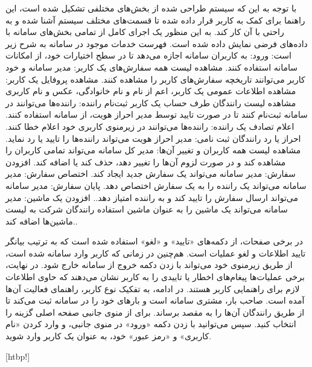 
با توجه به این که سیستم طراحی شده از بخش‌های مختلفی تشکیل شده است، این راهنما برای کمک به کاربر قرار داده شده تا قسمت‌های مختلف سیستم آشنا شده و به راحتی با آن کار کند. به این منظور یک اجرای کامل از تمامی بخش‌های سامانه با داده‌های فرضی نمایش داده شده است. فهرست خدمات موجود در سامانه به شرح زیر است:
     ورود: به کاربران سامانه اجازه می‌دهد تا در سطح اختیارات خود، از امکانات سامانه استفاده کنند.
     مشاهده لیست همه سفارش‌های یک کاربر: مدیر سامانه و خود کاربر می‌توانند تاریخچه سفارش‌های کاربر را مشاهده کنند.
     مشاهده پروفایل یک کاربر: مشاهده اطلاعات عمومی یک کاربر، اعم از نام و نام خانوادگی، عکس و نام کاربری
     مشاهده لیست رانندگان طرف حساب یک کاربر
     ثبت‌نام راننده: راننده‌ها می‌توانند در سامانه ثبت‌نام کنند تا در صورت تایید توسط مدیر احراز هویت، از سامانه استفاده کنند.
     اعلام تصادف یک راننده: راننده‌ها می‌توانند در زیرمنوی کاربری خود اعلام خطا کنند.
     احراز یا رد رانندگان ثبت نامی: مدیر احراز هویت می‌تواند راننده‌ها را تایید یا رد نماید.
     مشاهده لیست همه کاربران و تغییر آن‌ها: مدیر کل سامانه می‌تواند تمامی کاربران را مشاهده کند و در صورت لزوم آن‌ها را تغییر دهد، حذف کند یا اضافه کند.
     افزودن سفارش: مدیر سامانه می‌تواند یک سفارش جدید ایجاد کند.
     اختصاص سفارش: مدیر سامانه می‌تواند یک راننده را به یک سفارش اختصاص دهد.
     پایان سفارش: مدیر سامانه می‌تواند ارسال سفارش را تایید کند و به راننده امتیاز دهد..
     افزودن یک ماشین: مدیر سامانه می‌تواند یک ماشین را به عنوان ماشین استفاده رانندگان شرکت به لیست ماشین‌ها اضافه کند..
    
در برخی صفحات، از دکمه‌های «تایید» و «لغو» استفاده شده است که به ترتیب بیانگر تایید اطلاعات و لغو عملیات است. هم‌چنین در زمانی که کاربر وارد سامانه شده است، از طریق زیرمنوی خود می‌تواند با زدن دکمه خروج از سامانه خارج شود. در نهایت، برخی عملیات‌ها پیغام‌های اخطار یا تاییدی را به کاربر نشان می‌دهند که حاوی اطلاعات لازم برای راهنمایی کاربر هستند. در ادامه، به تفکیک نوع کاربر، راهنمای فعالیت آن‌ها آمده است.
\newpage
{}
     
             صاحب بار، مشتری سامانه است و بارهای خود را در سامانه ثبت می‌کند تا از طریق رانندگان آن‌ها را به مقصد برساند. برای  از منوی جانبی صفحه اصلی گزینه  را انتخاب کنید. سپس می‌توانید با زدن دکمه «ورود» در منوی جانبی، و وارد کردن «نام کاربری» و «رمز عبور» خود، به عنوان یک کاربر  وارد شوید.

    [htbp!]

